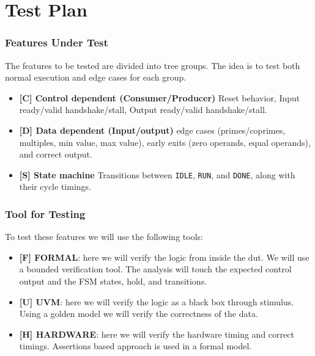 \chapter{Test Plan}
\label{cha:test_plan}

\subsection*{Features Under Test}
The features to be tested are divided into tree groups.
The idea is to test both normal execution and edge cases for each group.
\begin{itemize}
    \item \textbf{[C] Control dependent (Consumer/Producer)}
    Reset behavior, Input ready/valid handshake/stall, Output ready/valid handshake/stall.
    \item \textbf{[D] Data dependent (Input/output)}
    edge cases (primes/coprimes, multiples, min value, max value), early exits (zero operands, equal operands), and correct output.
    \item \textbf{[S] State machine}
    Transitions between \texttt{IDLE}, \texttt{RUN}, and \texttt{DONE}, along with their cycle timings.
\end{itemize}

\subsection*{Tool for Testing}
To test these features we will use the following tools:
\begin{itemize}
    \item \textbf{[F] FORMAL}: here we will verify the logic from inside the dut.
    We will use a bounded verification tool.
    The analysis will touch the expected control output and the FSM states, hold, and transitions.
    \item \textbf{[U] UVM}: here we will verify the logic as a black box through stimulus.
    Using a golden model we will verify the correctness of the data.
    \item \textbf{[H] HARDWARE}: here we will verify the hardware timing and correct timings.
    Assertions based approach is used in a formal model.
\end{itemize}

